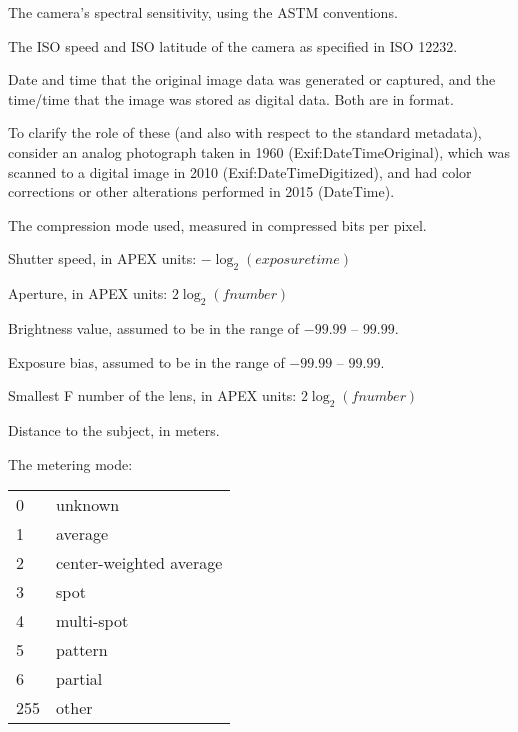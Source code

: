 The camera's spectral sensitivity, using the ASTM conventions.
\apiend

The ISO speed and ISO latitude of the camera as specified in ISO 12232.
\apiend


Date and time that the original image data was generated or captured,
and the time/time that the image was stored as digital data. Both are in
 format.

To clarify the role of these (and also with respect to the standard
 metadata), consider an analog photograph taken in 1960
({\cf Exif:DateTimeOriginal}), which was scanned to a digital image in 2010
({\cf Exif:DateTimeDigitized}), and had color corrections or other
alterations performed in 2015 ({\cf DateTime}).
\apiend

The compression mode used, measured in compressed bits per pixel.
\apiend

Shutter speed, in APEX units: $-\log_2 (\mathit{exposure time})$
\apiend

Aperture, in APEX units: $2 \log_2 (\mathit{fnumber})$
\apiend

Brightness value, assumed to be in the range of $-99.99$ -- $99.99$.
\apiend

Exposure bias, assumed to be in the range of $-99.99$ -- $99.99$.
\apiend

Smallest F number of the lens, in APEX units: $2 \log_2 (\mathit{fnumber})$
\apiend

Distance to the subject, in meters.
\apiend

The metering mode:

\smallskip

\begin{tabular}{p{0.3in} p{4in}}
0 & unknown \\
1 & average \\
2 & center-weighted average \\
3 & spot \\
4 & multi-spot \\
5 & pattern \\
6 & partial \\
255 & other
\end{tabular}
\apiend

